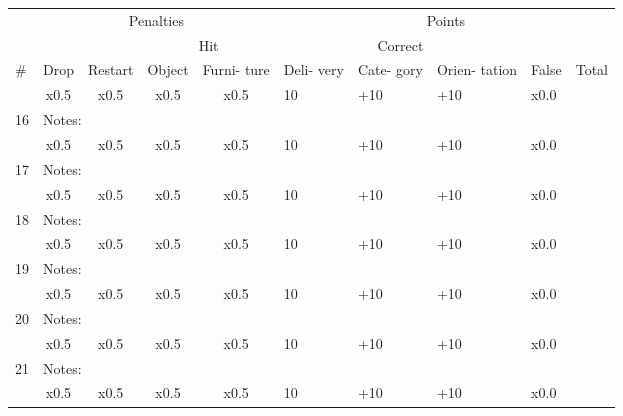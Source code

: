 \documentclass{article}
\begin{document}
\clearpage

\begin{center}
\begin{tabular}{|m{0.4cm}|m{0.8cm}|m{1cm}|m{1cm}|m{1.2cm}|m{0.8cm}|m{0.8cm}|m{1cm}|m{0.8cm}|m{0.8cm}|}
    \hline
    &\multicolumn{4}{|c|}{Penalties }& \multicolumn{5}{|c|}{Points }\\
    \cline{2-10}
    & & &\multicolumn{2}{|c|}{Hit}&\multicolumn{3}{|c|}{Correct}& &\\
    \cline{4-5} \cline{6-8}
    \#& Drop& Restart& Object& Furni- ture& Deli- very& Cate- gory& Orien- tation& False& Total \\
    \hline
     & \multicolumn{1}{|c|}{x0.5} & \multicolumn{1}{|c|}{x0.5} & \multicolumn{1}{|c|}{x0.5} & \multicolumn{1}{|c|}{x0.5}& 10& +10& +10& x0.0&\\
    \cline{2-9}
    16 & \multicolumn{8}{|l|}{Notes: }&\\
    \hline
     & \multicolumn{1}{|c|}{x0.5} & \multicolumn{1}{|c|}{x0.5} & \multicolumn{1}{|c|}{x0.5} & \multicolumn{1}{|c|}{x0.5}& 10& +10& +10& x0.0&\\
    \cline{2-9}
    17 & \multicolumn{8}{|l|}{Notes: }&\\
    \hline
     & \multicolumn{1}{|c|}{x0.5} & \multicolumn{1}{|c|}{x0.5} & \multicolumn{1}{|c|}{x0.5} & \multicolumn{1}{|c|}{x0.5}& 10& +10& +10& x0.0&\\
    \cline{2-9}
    18 & \multicolumn{8}{|l|}{Notes: }&\\
    \hline
     & \multicolumn{1}{|c|}{x0.5} & \multicolumn{1}{|c|}{x0.5} & \multicolumn{1}{|c|}{x0.5} & \multicolumn{1}{|c|}{x0.5}& 10& +10& +10& x0.0&\\
    \cline{2-9}
    19 & \multicolumn{8}{|l|}{Notes: }&\\
    \hline
     & \multicolumn{1}{|c|}{x0.5} & \multicolumn{1}{|c|}{x0.5} & \multicolumn{1}{|c|}{x0.5} & \multicolumn{1}{|c|}{x0.5}& 10& +10& +10& x0.0&\\
    \cline{2-9}
    20 & \multicolumn{8}{|l|}{Notes: }&\\
    \hline
     & \multicolumn{1}{|c|}{x0.5} & \multicolumn{1}{|c|}{x0.5} & \multicolumn{1}{|c|}{x0.5} & \multicolumn{1}{|c|}{x0.5}& 10& +10& +10& x0.0&\\
    \cline{2-9}
    21 & \multicolumn{8}{|l|}{Notes: }&\\
    \hline
     & \multicolumn{1}{|c|}{x0.5} & \multicolumn{1}{|c|}{x0.5} & \multicolumn{1}{|c|}{x0.5} & \multicolumn{1}{|c|}{x0.5}& 10& +10& +10& x0.0&\\

\end{tabular}
\end{center}
\end{document}
